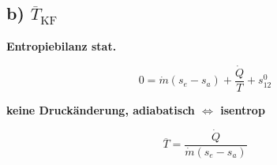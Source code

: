 \subsection*{b) $\overline{T}_{\text{KF}}$}

\textbf{Entropiebilanz stat.}

\[
0 = \dot{m} \left( s_e - s_a \right) + \frac{\dot{Q}}{T} + s^0_{12}
\]

\textbf{keine Druckänderung, adiabatisch $\Leftrightarrow$ isentrop}

\[
\overline{T} = \frac{\dot{Q}}{\dot{m} (s_e - s_a)}
\]